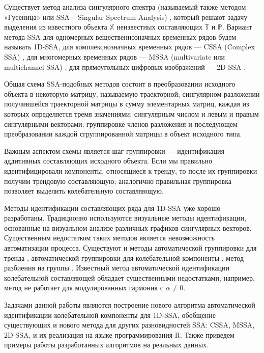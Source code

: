 \documentclass[specialist,
               substylefile = spbu.rtx,
               subf,href,colorlinks=true, 12pt]{disser}
\begin{document}
Существует метод анализа сингулярного спектра (называемый также методом «Гусеница» или SSA – Singular Spectrum Analysis) \cite{Golyandina.etal2001}, который решают задачу выделения из известного объекта $\mathbb{X}$ неизвестных составляющих $\mathbb{T}$ и $\mathbb{P}$. 
Вариант метода SSA для одномерных вещественнозначных временных рядов будем называть 1D-SSA, для комплекснозначных временных рядов --- CSSA (Complex SSA) \cite{Golyandina.etal2003,Keppenne.Lall1996,Eftaxias.etal2015}, для многомерных временных рядов --- MSSA (multivariate или multichannel SSA) \cite{Golyandina.etal2003, Rssa}, для прямоугольных цифровых изображений --- 2D-SSA \cite{Golyandina.Usevich2010,Rssa}. 

Общая схема SSA-подобных методов состоит в преобразовании исходного объекта в некоторую матрицу, называемую траекторной; сингулярном разложении получившейся траекторной матрицы в сумму элементарных матриц, каждая из которых определяется тремя значениями: сингулярным числом и левым и правым сингулярными векторами; группировке членов разложения и последующем преобразовании каждой сгруппированной матрицы в объект исходного типа. 

Важным аспектом схемы является шаг группировки --- идентификация аддитивных составляющих исходного объекта. 
Если мы правильно идентифицировали компоненты, относящиеся к тренду, то после их группировки получим трендовую составляющую;
аналогично правильная группировка позволяет выделить колебательную составляющую.

Методы идентификации составляющих ряда для 1D-SSA уже хорошо разработаны. 
Традиционно используются визуальные методы идентификации, основанные на визуальном анализе различных графиков сингулярных векторов. Существенным недостатком таких методов является невозможность автоматизации процесса. Существуют и методы автоматической группировки для тренда \cite{Alexandrov2009,Golyandina.Zhigljavsky2012}, автоматической группировки для колебательной компоненты \cite{Alexandrov.Golyandina2005, Alexandrov2006}, метод разбиения на группы \cite{Golyandina.Zhigljavsky2012}. Известный метод автоматической идентификации колебательной составляющей \cite{Alexandrov.Golyandina2005} обладает существенными недостатками, например, метод не работает для модулированных гармоник с $\alpha \not = 0$. 

Задачами данной работы являются построение нового алгоритма автоматической идентификации колебательной компоненты для 1D-SSA, обобщение существующих и нового метода для других разновидностей SSA: CSSA, MSSA, 2D-SSA, и их реализация на языке программирования R.
Также приведем примеры работы разработанных алгоритмов на реальных данных. 
\end{document}
